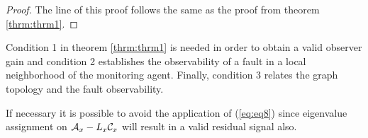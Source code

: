 \documentclass[letterpaper, 11 pt, conference]{ieeeconf}  %
\begin{document}
\smallskip
\begin{proof}
The line of this proof follows the same as the proof from theorem \ref{thrm:thrm1}. 
\end{proof}
\begin{remark}
Condition 1 in theorem \ref{thrm:thrm1} is needed in order to obtain a valid observer gain and condition 2 establishes the observability of a fault in a local neighborhood of the monitoring agent. Finally, condition 3 relates the graph topology and the fault observability. 
\end{remark}
\begin{remark}
If necessary it is possible to avoid the application of (\ref{eq:eq8}) since eigenvalue assignment on $\mathcal{A}_x-L_x \mathcal{C}_x$ will result in a valid residual signal also.
\end{remark}
\end{document}
